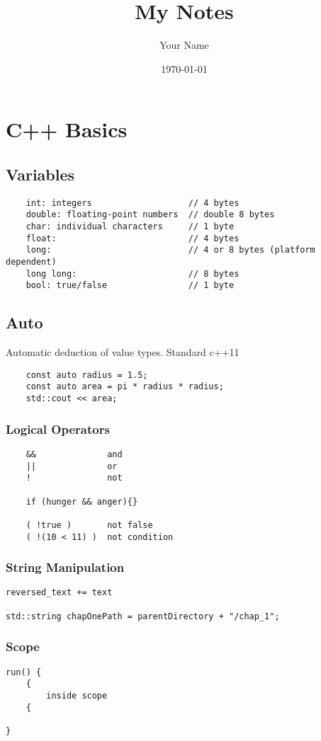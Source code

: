 \documentclass{report}
\begin{document}
\title{My Notes}
\author{Your Name}
\date{\today}

\maketitle

\tableofcontents
\chapter{C++ Basics}

\section{Variables}

\begin{verbatim}
    int: integers                   // 4 bytes
    double: floating-point numbers  // double 8 bytes
    char: individual characters     // 1 byte
    float:                          // 4 bytes
    long:                           // 4 or 8 bytes (platform dependent)
    long long:                      // 8 bytes
    bool: true/false                // 1 byte
\end{verbatim}

\section{Auto}

Automatic deduction of value types. Standard c++11

\begin{verbatim}
    const auto radius = 1.5;
    const auto area = pi * radius * radius;
    std::cout << area;
\end{verbatim}

\subsection{Logical Operators}

\begin{verbatim}
    &&              and
    ||              or
    !               not

    if (hunger && anger){}

    ( !true )       not false
    ( !(10 < 11) )  not condition
\end{verbatim}

\subsection{String Manipulation}

\begin{verbatim}
reversed_text += text

std::string chapOnePath = parentDirectory + "/chap_1";
\end{verbatim}

\subsection{Scope}

\begin{verbatim}
run() {
    {
        inside scope
    {

}
\end{verbatim}
\end{document}
